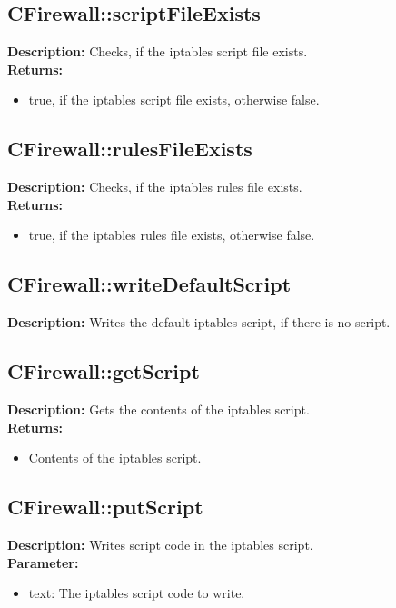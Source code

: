 \subsection{CFirewall::scriptFileExists}
\textbf{Description:} Checks, if the iptables script file exists.\\
\textbf{Returns:}
\begin{itemize}
\item true, if the iptables script file exists, otherwise false.
\end{itemize}

\subsection{CFirewall::rulesFileExists}
\textbf{Description:} Checks, if the iptables rules file exists.\\
\textbf{Returns:}
\begin{itemize}
\item true, if the iptables rules file exists, otherwise false.
\end{itemize}

\subsection{CFirewall::writeDefaultScript}
\textbf{Description:} Writes the default iptables script, if there is no script.\\

\subsection{CFirewall::getScript}
\textbf{Description:} Gets the contents of the iptables script.\\
\textbf{Returns:}
\begin{itemize}
\item Contents of the iptables script.
\end{itemize}

\subsection{CFirewall::putScript}
\textbf{Description:} Writes script code in the iptables script.\\
\textbf{Parameter:}
\begin{itemize}
\item text: The iptables script code to write.
\end{itemize}

